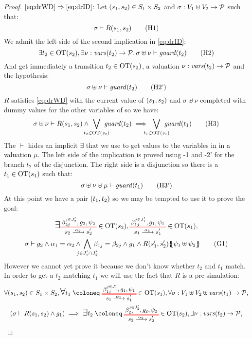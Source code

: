 \documentclass{article}
\begin{document}
\begin{proof}
\item[\(\eqref{eq:drWD}\Rightarrow\eqref{eq:drID}\):]
	Let \({\left(s_1, s_2\right)} \in S_1 \times S_2\) and \(\sigma: V_1 \uplus V_2 \to \mathcal{P}\) such that:
	\[ \sigma \vdash R\mpar{s_1, s_2} \hyp{1} \]
	We admit the left side of the second implication in \eqref{eq:drID}:
	\[ \exists t_2 \in \fOT{s_2}, \exists \nu: \fvars{t_2} \to \values, \sigma \uplus \nu \vdash \fguard{t_2} \hyp{2} \]
	And get immediately a transition \(t_2 \in \mathrm{OT}{\left(s_2\right)}\), a valuation \(\nu: \mathit{vars}{\left(t_2\right)} \to \mathcal{P}\) and the hypothesis:
	\[ \sigma \uplus \nu \vdash \fguard{t_2} \hyp{2'} \]
	\(R\) satisfies \eqref{eq:drWD} with the current value of \({\left(s_1, s_2\right)}\) and \(\sigma \uplus \nu\) completed with dummy values for the other variables of  so we have:
	\[ \sigma \uplus \nu \vdash R\mpar{s_1, s_2} \wedge \bigvee_\subbox{t_2 \in \fOT{s_2}} \fguard{t_2} \implies \bigvee_\subbox{t_1 \in \fOT{s_1}} \fguard{t_1} \hyp{3} \]
	The \(\vdash\) hides an implicit \(\exists\) that we use to get values to the variables in  in a valuation \(\mu\).
	The left side of the implication is proved using \hyp{1} and \hyp{2'} for the branch \(t_2\) of the disjunction.
	The right side is a disjunction so there is a \(t_1 \in \mathrm{OT}{\left(s_1\right)}\) such that:
	\[ \sigma \uplus \nu \uplus \mu \vdash \fguard{t_1} \hyp{3'} \]
	At this point we have a pair \({\left(t_1, t_2\right)}\) so we may be tempted to use it to prove the goal:
	\begin{multline}
		\bigsymb{\exists} \OTx{2}{}{2}{2} \in \fOT{s_2}, \OTx{1}{}{1}{1} \in \fOT{s_1}, \\
		\sigma \vdash g_2 \wedge \alpha_1 = \alpha_2 \wedge \bigwedge_\subbox{j \in J'_1 \cap J'_2} \beta_{1j} = \beta_{2j} \wedge g_1 \wedge R\mpar{s'_1, s'_2}\psubst{\psi_1 \uplus \psi_2} \goal{1}
	\end{multline}
	However we cannot yet prove it because we don't know whether \(t_2\) and \(t_1\) match.
	In order to get a \(t_2\) matching \(t_1\) we will use the fact that \(R\) is a pre-simulation:
	\begin{multline}
		\forall \mpar{s_1, s_2} \in S_1 \times S_2, \bigsymb{\forall} t_1 \defobject \OTx{1}{}{1}{1} \in \fOT{s_1}, \forall \sigma: V_1 \uplus V_2 \uplus \fvars{t_1} \to \values, \\
		\mpar{\sigma \vdash R\mpar{s_1, s_2} \wedge g_1} \implies \bigsymb{\exists} t_2 \defobject \OTx{2}{}{2}{2} \in \fOT{s_2}, \exists \nu: \fvars{t_2} \to \values, \\

\end{multline}
\end{proof}
\end{document}

